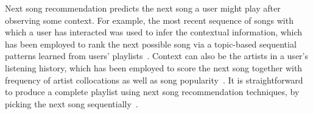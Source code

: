Next song recommendation %
predicts
the next song a user might play after observing some context.
For example, the most recent sequence of songs with which a user has interacted was used to
infer the contextual information,
which has been employed %
to rank the next possible song
via %
a topic-based sequential patterns learned from users' playlists~\cite{hariri2012context}.
Context can also be the artists %
in a user's listening history,
which has been %
employed to score the next song together with frequency of artist collocations
as well as song popularity~\cite{mcfee2012million,bonnin2013evaluating}.
It is straightforward to produce a complete playlist using next song recommendation techniques,
\ie by picking the next song sequentially~\cite{bonnin2013evaluating,ben2017groove}.
%


